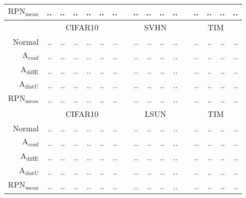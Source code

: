\begin{table}[ht]
\begin{tiny}
\begin{tabular}{@{}rrrrrrrcrrrrcrrrr@{}}
			$\mathrm{RPN}_{\mathrm{mean}}$ & .. & .. & .. & .. & .. & .. & & .. & .. & .. & .. & & .. & .. & .. & .. \\
			\midrule
			& \multicolumn{6}{c}{CIFAR10} & & \multicolumn{4}{c}{SVHN} & & \multicolumn{4}{c}{TIM} \\
			Normal                         & .. & .. & .. & .. & .. & .. & & .. & .. & .. & .. & & .. & .. & .. & .. \\
			$\mathrm{A}_{\mathrm{conf}}$  & .. & .. & .. & .. & .. & .. & & .. & .. & .. & .. & & .. & .. & .. & .. \\
			$\mathrm{A}_{\mathrm{diffE}}$ & .. & .. & .. & .. & .. & .. & & .. & .. & .. & .. & & .. & .. & .. & .. \\
			$\mathrm{A}_{\mathrm{distU}}$ & .. & .. & .. & .. & .. & .. & & .. & .. & .. & .. & & .. & .. & .. & .. \\
			$\mathrm{RPN}_{\mathrm{mean}}$ & .. & .. & .. & .. & .. & .. & & .. & .. & .. & .. & & .. & .. & .. & .. \\
			\midrule
			& \multicolumn{6}{c}{CIFAR10} & & \multicolumn{4}{c}{LSUN} & & \multicolumn{4}{c}{TIM} \\
			Normal                         & .. & .. & .. & .. & .. & .. & & .. & .. & .. & .. & & .. & .. & .. & .. \\
			$\mathrm{A}_{\mathrm{conf}}$  & .. & .. & .. & .. & .. & .. & & .. & .. & .. & .. & & .. & .. & .. & .. \\
			$\mathrm{A}_{\mathrm{diffE}}$ & .. & .. & .. & .. & .. & .. & & .. & .. & .. & .. & & .. & .. & .. & .. \\
			$\mathrm{A}_{\mathrm{distU}}$ & .. & .. & .. & .. & .. & .. & & .. & .. & .. & .. & & .. & .. & .. & .. \\
			$\mathrm{RPN}_{\mathrm{mean}}$ & .. & .. & .. & .. & .. & .. & & .. & .. & .. & .. & & .. & .. & .. & .. \\
			\bottomrule
		\end{tabular}
	\end{tiny}
	\label{tab:res_smoothing}
\end{table}


